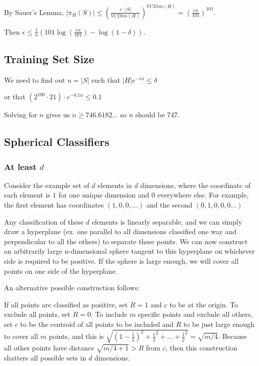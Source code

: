 \documentclass[]{article}
\begin{document}
By Sauer's Lemma, $|\pi_H(S)| \le (\frac{e\cdot |S|}{VCDim(H)})^{VCDim(H)} = (\frac{en}{101})^{101}$.

Then $\epsilon \le \frac{1}{n}(101\log(\frac{en}{101}) - \log(1-\delta))$.

\subsection{Training Set Size}

We need to find out $n=|S|$ such that $|H|e^{-\epsilon n} \le \delta$

or that $(2^{100} \cdot 21)\cdot e^{-0.1n} \le 0.1$

Solving for $n$ gives us $n \ge 746.6182...$ so $n$ should be 747.

\subsection{Spherical Classifiers}

\subsubsection{At least $d$}
Consider the example set of $d$ elements in $d$ dimensions, where the coordinate of each element is $1$ for one unique dimension and $0$ everywhere else. For example, the first element has coordinates $(1,0,0,...)$ and the second $(0,1,0,0,0...)$

Any classification of these $d$ elements is linearly separable, and we can simply draw a hyperplane (ex. one parallel to all dimensions classified one way and perpendicular to all the others) to separate these points. We can now construct an arbitrarily large n-dimensional sphere tangent to this hyperplane on whichever side is required to be positive. If the sphere is large enough, we will cover all points on one side of the hyperplane.

An alternative possible construction follows:

If all points are classified as positive, set $R=1$ and $c$  to be at the origin. To exclude all points, set $R=0$. To include $m$ specific points and exclude all others, set $c$ to be the centroid of all points to be included and $R$ to be just large enough to cover all $m$ points, and this is $\sqrt{(1-\frac{1}{2})^2 + \frac{1}{2}^2 + ... + \frac{1}{2}^2} = \sqrt{m/4}$. Because all other points have distance $\sqrt{m/4+1} > R$ from $c$, then this construction shatters all possible sets in $d$ dimensions.
\end{document}
